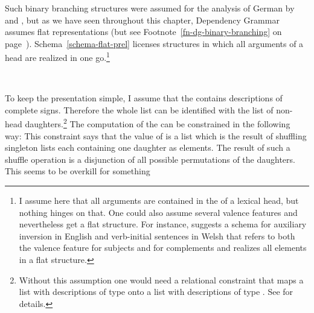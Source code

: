 Such binary branching structures were assumed for the analysis of German by \citet{Kathol95a,Kathol2000a} and
\citet{Mueller95c,Babel,Mueller99a,Mueller2002b}, but as we have seen throughout this chapter, Dependency
Grammar assumes flat representations (but see Footnote~\ref{fn-dg-binary-branching} on page~\pageref{fn-dg-binary-branching}). Schema~\ref{schema-flat-prel} licenses structures in which all arguments of a
head are realized in one go.\footnote{%
I assume here that all arguments are contained in the \subcatl of a
lexical head, but nothing hinges on that. One could also assume several valence features and
nevertheless get a flat structure. For instance, \citet[]{Borsley89} suggests a schema for auxiliary inversion in
English and verb-initial sentences in Welsh that refers to both the valence feature for subjects and for complements and realizes all
elements in a flat structure.%
}
\begin{schema}
\label{schema-flat-prel}
 \impl\\
\end{schema}
To keep the presentation simple, I assume that the \subcatl contains descriptions of complete
signs. Therefore the whole list can be identified with the list of non-head daughters.\footnote{%
  Without this assumption one would need a relational constraint that maps a list with descriptions of type
   onto a list with descriptions of type . See  for details.
}
The computation of the \domv can be constrained in the following way:
\ea
{} \impl
{}
\z
This constraint says that the value of \dom is a list which is the result of shuffling singleton
lists each containing one daughter as elements. The result of such a shuffle operation is a
disjunction of all possible permutations of the daughters. This seems to be overkill for something
